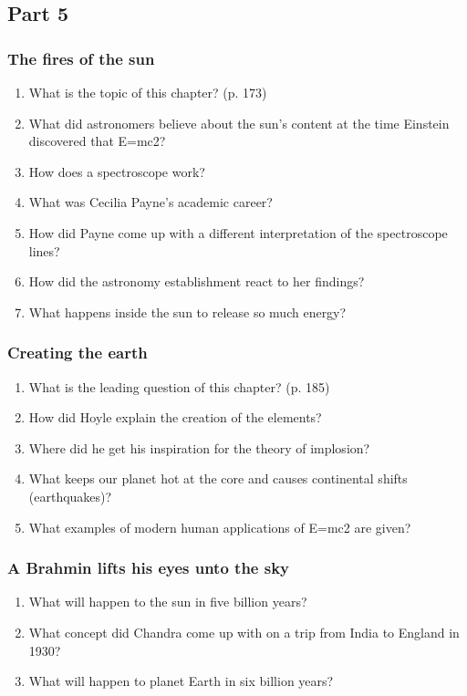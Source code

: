 \newpage
\subsection*{Part 5}
\subsubsection*{The fires of the sun}
\begin{enumerate}  
\item What is the topic of this chapter? (p. 173)
\item What did astronomers believe about the sun’s content at the time Einstein discovered that E=mc2? 
\item How does a spectroscope work?
\item What was Cecilia Payne’s academic career?
\item How did Payne come up with a different interpretation of the spectroscope lines?
\item How did the astronomy establishment react to her findings?
\item What happens inside the sun to release so much energy?
\end{enumerate}

\subsubsection*{Creating the earth}
\begin{enumerate}  
\item What is the leading question of this chapter? (p. 185)
\item How did Hoyle explain the creation of the elements? 
\item Where did he get his inspiration for the theory of implosion?
\item What keeps our planet hot at the core and causes continental shifts (earthquakes)?
\item What examples of modern human applications of E=mc2 are given?
\end{enumerate}

\subsubsection*{A Brahmin lifts his eyes unto the sky}
\begin{enumerate}  
\item What will happen to the sun in five billion years?
\item What concept did Chandra come up with on a trip from India to England in 1930? 
\item What will happen to planet Earth in six billion years?
\end{enumerate}



